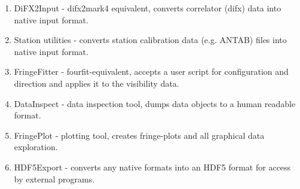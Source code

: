 \documentclass[hidelinks]{article}
\let\Oldsection\section
\renewcommand{\section}{\FloatBarrier\Oldsection}
\begin{document}
\begin{enumerate}
 \item DiFX2Input  - difx2mark4 equivalent, converts correlator (difx) data into native input format.
 \item Station utilities  - converts station calibration data (e.g. ANTAB) files into native input format.
 \item FringeFitter - fourfit-equivalent, accepts a user script for configuration and direction and applies it to the visibility data.
 \item DataInspect - data inspection tool, dumps data objects to a human readable format.
 \item FringePlot  - plotting tool, creates fringe-plots and all graphical data exploration.
 \item HDF5Export  - converts any native formats into an HDF5 format for access by external programs.
\end{enumerate}




%
%
\newpage
\addtocounter{section}{1}
\renewcommand{\refname}{\thesection. References}

\label{sec:references}

\printbibliography
%
%
\end{document}

